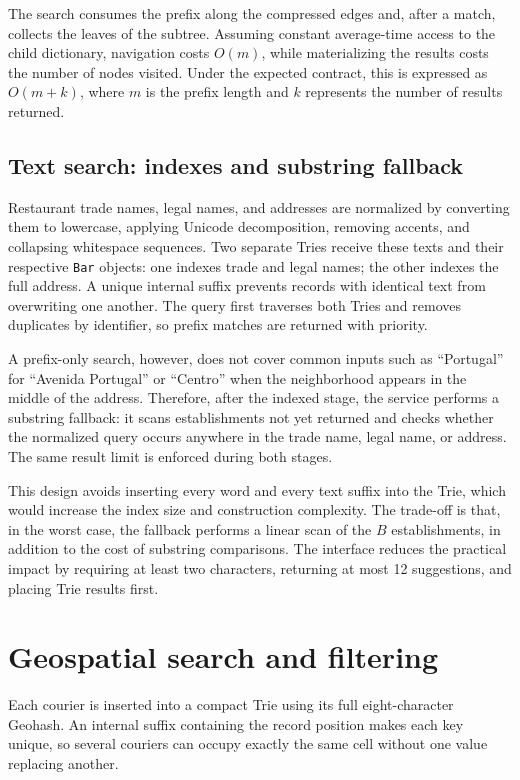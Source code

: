 \documentclass[12pt,a4paper]{article}
\begin{document}
The search consumes the prefix along the compressed edges and, after a match,
collects the leaves of the subtree. Assuming constant average-time access to
the child dictionary, navigation costs $O(m)$, while materializing the results
costs the number of nodes visited. Under the expected contract, this is
expressed as $O(m+k)$, where $m$ is the prefix length and $k$ represents the
number of results returned.

\subsection{Text search: indexes and substring fallback}

Restaurant trade names, legal names, and addresses are normalized by converting
them to lowercase, applying Unicode decomposition, removing accents, and
collapsing whitespace sequences. Two separate Tries receive these texts and
their respective \texttt{Bar} objects: one indexes trade and legal names; the
other indexes the full address. A unique internal suffix prevents records with
identical text from overwriting one another. The query first traverses both
Tries and removes duplicates by identifier, so prefix matches are returned with
priority.

A prefix-only search, however, does not cover common inputs such as
``Portugal'' for ``Avenida Portugal'' or ``Centro'' when the neighborhood
appears in the middle of the address. Therefore, after the indexed stage, the
service performs a substring fallback: it scans establishments not yet
returned and checks whether the normalized query occurs anywhere in the trade
name, legal name, or address. The same result limit is enforced during both
stages.

This design avoids inserting every word and every text suffix into the Trie,
which would increase the index size and construction complexity. The trade-off
is that, in the worst case, the fallback performs a linear scan of the $B$
establishments, in addition to the cost of substring comparisons. The
interface reduces the practical impact by requiring at least two characters,
returning at most 12 suggestions, and placing Trie results first.

\section{Geospatial search and filtering}

Each courier is inserted into a compact Trie using its full eight-character
Geohash. An internal suffix containing the record position makes each key
unique, so several couriers can occupy exactly the same cell without one value
replacing another.
\end{document}
